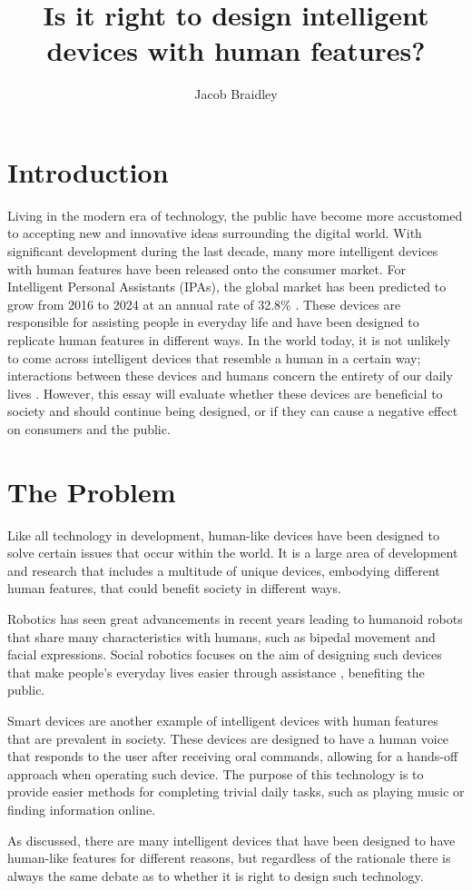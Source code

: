 \documentclass{article}
\title{Is it right to design intelligent devices with human features?}
\author{Jacob Braidley}
\date{}
\begin{document}
\maketitle

\vspace{0.5cm}

\section{Introduction}
Living in the modern era of technology, the public have become more accustomed to accepting new and innovative ideas surrounding the digital world. With significant development during the last decade, many more intelligent devices with human features have been released onto the consumer market. For Intelligent Personal Assistants (IPAs), the global market has been predicted to grow from 2016 to 2024 at an annual rate of 32.8\% \cite{tmr2016market}. These devices are responsible for assisting people in everyday life and have been designed to replicate human features in different ways. In the world today, it is not unlikely to come across intelligent devices that resemble a human in a certain way; interactions between these devices and humans concern the entirety of our daily lives \cite{securityTech2022interactions}. However, this essay will evaluate whether these devices are beneficial to society and should continue being designed, or if they can cause a negative effect on consumers and the public.

\section{The Problem}
Like all technology in development, human-like devices have been designed to solve certain issues that occur within the world. It is a large area of development and research that includes a multitude of unique devices, embodying different human features, that could benefit society in different ways.\par
Robotics has seen great advancements in recent years leading to humanoid robots that share many characteristics with humans, such as bipedal movement and facial expressions. Social robotics focuses on the aim of designing such devices that make people’s everyday lives easier through assistance \cite{wykowska2014social}, benefiting the public.\par
Smart devices are another example of intelligent devices with human features that are prevalent in society. These devices are designed to have a human voice that responds to the user after receiving oral commands, allowing for a hands-off approach when operating such device. The purpose of this technology is to provide easier methods for completing trivial daily tasks, such as playing music or finding information online.\par
As discussed, there are many intelligent devices that have been designed to have human-like features for different reasons, but regardless of the rationale there is always the same debate as to whether it is right to design such technology.
\end{document}

